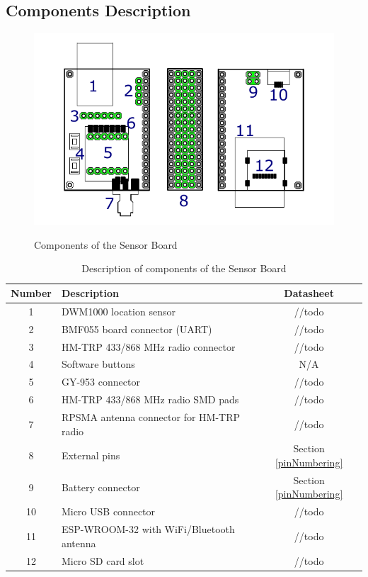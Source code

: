 \subsection{Components Description}

\begin{figure}[H]
	\centering
	\includegraphics[scale=1]{img/componentsDescription.pdf}
	\label{HWcomponents}
	\caption{Components of the Sensor Board}
\end{figure}

\begin{table}[H]
	\centering
	\begin{tabular}{|c|l|c|}
		\hline
		Number & Description & Datasheet\\
		\hline \hline
		1 & DWM1000 location sensor & //todo \\
		2 & BMF055 board connector (UART) & //todo \\
		3 & HM-TRP 433/868 MHz radio connector & //todo \\
		4 & Software buttons & N/A \\
		5 & GY-953 connector & //todo \\
		6 & HM-TRP 433/868 MHz radio SMD pads & //todo \\
		7 & RPSMA antenna connector for HM-TRP radio & //todo \\
		8 & External pins & Section \ref{pinNumbering} \\
		9 & Battery connector & Section \ref{pinNumbering} \\
		10 & Micro USB connector & //todo \\
		11 & ESP-WROOM-32 with WiFi/Bluetooth antenna & //todo \\
		12 & Micro SD card slot & //todo \\
		\hline
	\end{tabular}
	\caption{Description of components of the Sensor Board}
	\label{table:componentsDescription}
\end{table}

